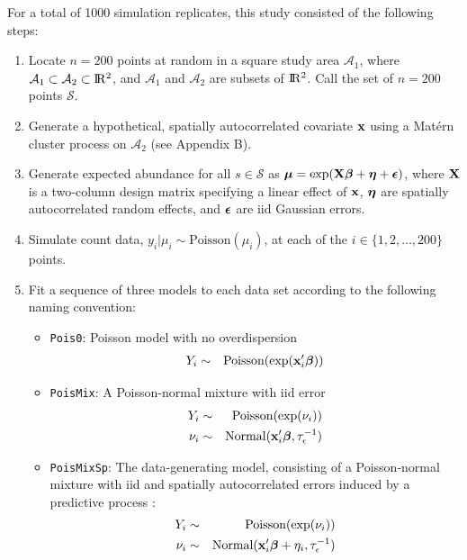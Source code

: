 \documentclass[12pt,english]{article}
\begin{document}
\begin{spacing}{1.9}
For a total of 1000 simulation replicates, this study consisted of the
following steps:
\begin{enumerate}
\item Locate $n=200$ points at random in a square study area
  $\mathcal{A}_1$, where
  $\mathcal{A}_1 \subset \mathcal{A}_2 \subset \R2$, and
  $\mathcal{A}_1$ and $\mathcal{A}_2$ are subsets of $\R2$.  Call the
  set of $n=200$ points $\mathcal{S}$.
\item Generate a hypothetical, spatially autocorrelated covariate
  ${\bf x}$ using a Mat\'{e}rn cluster process on $\mathcal{A}_2$ (see
  Appendix B).
\item Generate expected abundance for all $s \in \mathcal{S}$ as
  $\boldsymbol{\mu} = \exp( {\bf X}\boldsymbol{\beta} + \boldsymbol{\eta} +\boldsymbol{\epsilon} )$, where
  ${\bf X}$ is a two-column design matrix specifying a linear effect
  of ${\bf x}$, $\boldsymbol{\eta}$ are spatially autocorrelated random effects, and
  $\boldsymbol{\epsilon}$ are iid Gaussian errors.
\item Simulate count data, $y_i|\mu_i \sim \textrm{Poisson}(\mu_i)$,
  at each of the $i \in \{ 1,2,\hdots,200 \}$ points.
\item Fit a sequence of three models to each data set according to the
  following naming convention:
  \begin{itemize}
  \item \texttt{Pois0}: Poisson model with no overdispersion
    \begin{eqnarray*}
      Y_i & \sim & \textrm{Poisson}(\exp({\bf x}_i^\prime \boldsymbol{\beta})) \\
    \end{eqnarray*}
  \item \texttt{PoisMix}: A Poisson-normal mixture with iid error
    \begin{eqnarray*}
      Y_i & \sim & \textrm{Poisson}(\exp(\nu_i)) \\
      \nu_i & \sim & \textrm{Normal}({\bf x}_i^\prime \boldsymbol{\beta}, \tau_\epsilon^{-1})\\
    \end{eqnarray*}
  \item \texttt{PoisMixSp}: The data-generating model, consisting of a
    Poisson-normal mixture with iid and spatially autocorrelated
    errors induced by a predictive process
    \citep[cf.][]{BanerjeeEtAl2008}:
    \begin{eqnarray*}
      Y_i & \sim & \textrm{Poisson}(\exp(\nu_i)) \\
      \nu_i & \sim & \textrm{Normal}(\bfx_i^\prime \bfbeta + \eta_i, \tau_\epsilon^{-1}) \\

\end{eqnarray*}
\end{itemize}
\end{enumerate}
\end{spacing}
\end{document}
